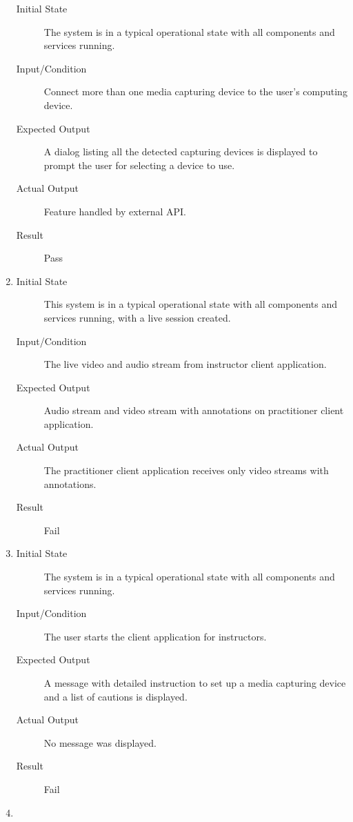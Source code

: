 \documentclass[12pt, titlepage]{article}
\begin{document}
\begin{enumerate}[NFR-T1]
    \begin{description}
    \item[Initial State] The system is in a typical operational state with all
      components and services running.
    \item[Input/Condition] Connect more than one media capturing device to the
      user’s computing device.
    \item[Expected Output] A dialog listing all the detected capturing devices is
      displayed to prompt the user for selecting a device to use.
    \item[Actual Output] Feature handled by external API.
    \item[Result] Pass
    \end{description}
  \item \label{NFRT14}
    \begin{description}
    \item[Initial State] This system is in a typical operational state with all
      components and services running, with a live session created.
    \item[Input/Condition] The live video and audio stream from instructor client
      application.
    \item[Expected Output] Audio stream and video stream with annotations on
      practitioner client application.
    \item[Actual Output] The practitioner client application receives only video
      streams with annotations.
    \item[Result] Fail
    \end{description}
  \item \label{NFRT15}
    \begin{description}
    \item[Initial State] The system is in a typical operational state with all
      components and services running.
    \item[Input/Condition] The user starts the client application for instructors.
    \item[Expected Output] A message with detailed instruction to set up a media
      capturing device and a list of cautions is displayed.
    \item[Actual Output] No message was displayed.
    \item[Result] Fail
    \end{description}
  \item \label{NFRT16}
    \begin{description}

\end{description}
\end{enumerate}
\end{document}
